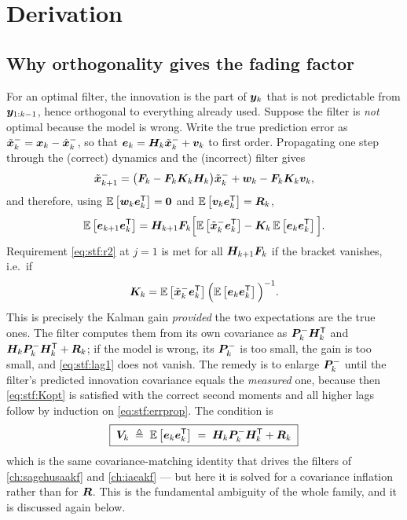 \section{Derivation}

\subsection{Why orthogonality gives the fading factor}
For an optimal filter, the innovation is the part of $\bm{y}_k$ that is not predictable from
$\bm{y}_{1:k-1}$, hence orthogonal to everything already used.  Suppose the filter is \emph{not}
optimal because the model is wrong.  Write the true prediction error as
$\tilde{\bm{x}}^-_k = \bm{x}_k - \hat{\bm{x}}^{-}_k$, so that $\bm{e}_k = \bm{H}_k\tilde{\bm{x}}^-_k+\bm{v}_k$ to first order.
Propagating one step through the (correct) dynamics and the (incorrect) filter gives
\begin{equation}
\tilde{\bm{x}}^-_{k+1} = \big(\bm{F}_k - \bm{F}_k\bm{K}_k\bm{H}_k\big)\tilde{\bm{x}}^-_k + \bm{w}_k - \bm{F}_k\bm{K}_k\bm{v}_k ,
\label{eq:stf:errprop}
\end{equation}
and therefore, using $\mathbb{E}\left[\bm{w}_k\bm{e}_k^{\mathsf{T}}\right]=\bm 0$ and $\mathbb{E}\left[\bm{v}_k\bm{e}_k^{\mathsf{T}}\right]=\bm{R}_k$,
\begin{equation}
\mathbb{E}\left[\bm{e}_{k+1}\bm{e}_k^{\mathsf{T}}\right] = \bm{H}_{k+1}\bm{F}_k\Big[\mathbb{E}\left[\tilde{\bm{x}}^-_k\bm{e}_k^{\mathsf{T}}\right] - \bm{K}_k\,\mathbb{E}\left[\bm{e}_k\bm{e}_k^{\mathsf{T}}\right]\Big].
\label{eq:stf:lag1}
\end{equation}
Requirement \eqref{eq:stf:r2} at $j=1$ is met for all $\bm{H}_{k+1}\bm{F}_k$ if the bracket vanishes,
i.e.\ if
\begin{equation}
\bm{K}_k = \mathbb{E}\left[\tilde{\bm{x}}^-_k\bm{e}_k^{\mathsf{T}}\right]\Big(\mathbb{E}\left[\bm{e}_k\bm{e}_k^{\mathsf{T}}\right]\Big)^{-1} .
\label{eq:stf:Kopt}
\end{equation}
This is precisely the Kalman gain \emph{provided} the two expectations are the true ones.  The
filter computes them from its own covariance as $\bm{P}^{-}_k\bm{H}_k^{\mathsf{T}}$ and
$\bm{H}_k\bm{P}^{-}_k\bm{H}_k^{\mathsf{T}}+\bm{R}_k$; if the model is wrong, its $\bm{P}^{-}_k$ is too small, the gain is
too small, and \eqref{eq:stf:lag1} does not vanish.  The remedy is to enlarge $\bm{P}^{-}_k$ until the
filter's predicted innovation covariance equals the \emph{measured} one, because then
\eqref{eq:stf:Kopt} is satisfied with the correct second moments and all higher lags follow by
induction on \eqref{eq:stf:errprop}.  The condition is
\begin{equation}
\boxed{\;\bm{V}_k \;\triangleq\; \mathbb{E}\left[\bm{e}_k\bm{e}_k^{\mathsf{T}}\right] \;=\; \bm{H}_k\bm{P}^{-}_k\bm{H}_k^{\mathsf{T}} + \bm{R}_k\;}
\label{eq:stf:cond}
\end{equation}
which is the same covariance-matching identity that drives the filters of
\cref{ch:sagehusaakf} and \cref{ch:iaeakf} --- but here it is solved for a covariance inflation rather than for
$\bm{R}$.  This is the fundamental ambiguity of the whole family, and it is discussed again below.

